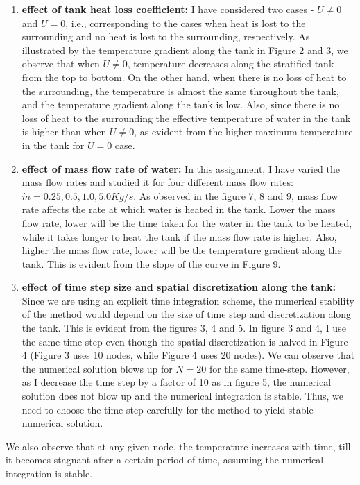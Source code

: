 \documentclass{article}
\begin{document}
\begin{enumerate}
\item
\textbf{effect of tank heat loss coefficient:} I have considered two cases - $U \neq 0$ and $U = 0$, i.e., corresponding to the cases when heat is lost to the surrounding and no heat is lost to the surrounding, respectively. As illustrated by the temperature gradient along the tank in Figure 2 and 3, we observe that when $U \neq 0$, temperature decreases along the stratified tank from the top to bottom. On the other hand, when there is no loss of heat to the surrounding, the temperature is almost the same throughout the tank, and the temperature gradient along the tank is low. Also, since there is no loss of heat to the surrounding the effective temperature of water in the tank is higher than when $U \neq 0$, as evident from the higher maximum temperature in the tank for $U = 0$ case.

\item
\textbf{effect of mass flow rate of water:}
In this assignment, I have varied the mass flow rates and studied it for four different mass flow rates: $\dot{m} = 0.25, 0.5, 1.0, 5.0 Kg/s$. As observed in the figure 7, 8 and 9, mass flow rate affects the rate at which water is heated in the tank. Lower the mass flow rate, lower will be the time taken for the water in the tank to be heated, while it takes longer to heat the tank if the mass flow rate is higher. Also, higher the mass flow rate, lower will be the temperature gradient along the tank. This is evident from the slope of the curve in Figure 9. 

\item
\textbf{effect of time step size and spatial discretization along the tank:}
Since we are using an explicit time integration scheme, the numerical stability of the method would depend on the size of time step and discretization along the tank. This is evident from the figures 3, 4 and 5. In figure 3 and 4, I use the same time step even though the spatial discretization is halved in Figure 4 (Figure 3 uses 10 nodes, while Figure 4 uses 20 nodes). We can observe that the numerical solution blows up for $N = 20$ for the same time-step. However, as I decrease the time step by a factor of 10 as in figure 5, the numerical solution does not blow up and the numerical integration is stable. Thus, we need to choose the time step carefully for the method to yield stable numerical solution.

\end{enumerate}
We also observe that at any given node, the temperature increases with time, till it becomes stagnant after a certain period of time, assuming the numerical integration is stable.
\end{document}
